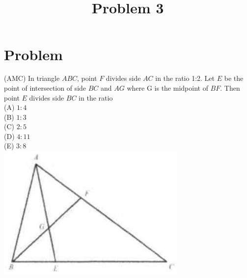 \documentclass{article}
\title{Problem 3}
\date{}
\begin{document}
\maketitle

\section*{Problem}
(AMC) In triangle \(A B C\), point \(F\) divides side \(A C\) in the ratio 1:2. Let \(E\) be the point of intersection of side \(B C\) and \(A G\) where G is the midpoint of \(B F\). Then point \(E\) divides side \(B C\) in the ratio\\
(A) \(1: 4\)\\
(B) \(1: 3\)\\
(C) \(2: 5\)\\
(D) \(4: 11\)\\
(E) \(3: 8\)\\
\centering
\includegraphics[width=\textwidth]{images/126.jpg}
\end{document}

